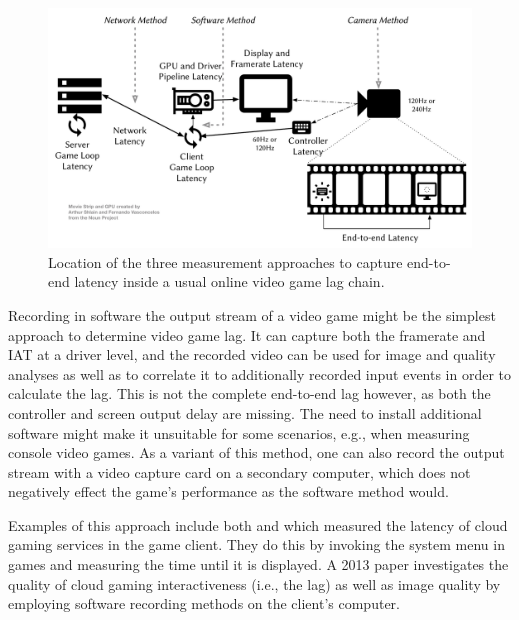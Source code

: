 \begin{figure}[!t]
    \centering
    \includegraphics[width=1.0\columnwidth]{../models/e2e-lag.pdf}
    \caption{Location of the three measurement approaches to capture end-to-end latency inside a usual online video game lag chain.}
\label{fig:measurement-methods}
\end{figure}


Recording in software the output stream of a video game might be the simplest approach to determine video game lag. It can capture both the framerate and \gls{IAT} at a driver level, and the recorded video can be used for image and quality analyses as well as to correlate it to additionally recorded input events in order to calculate the lag. This is not the complete end-to-end lag however, as both the controller and screen output delay are missing. The need to install additional software might make it unsuitable for some scenarios, e.g., when measuring console video games. As a variant of this method, one can also record the output stream with a video capture card on a secondary computer, which does not negatively effect the game's performance as the software method would.

Examples of this approach include both \cite{Chen:2011:MLC:2072298.2071991} and \cite{6670099} which measured the latency of cloud gaming services in the game client. They do this by invoking the system menu in games and measuring the time until it is displayed. A 2013 paper \cite{6574660} investigates the quality of cloud gaming interactiveness (i.e., the lag) as well as image quality by employing software recording methods on the client's computer.


